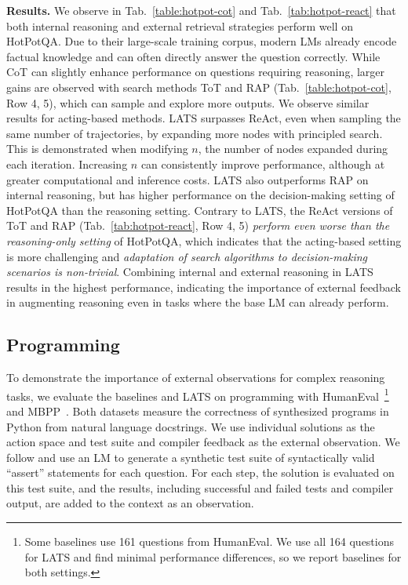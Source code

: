 \documentclass{article}
\newcommand{\yxw}[1]{\textcolor{blue}{[{\bf yxw:} #1]}}
\newcommand{\kai}[1]{\textcolor{purple}{[{\bf kai:} #1]}}
\newcommand{\az}[1]{\textcolor{orange}{[{\bf andy:} #1]}}
\theoremstyle{plain}
\theoremstyle{definition}
\theoremstyle{remark}
\begin{document}
\textbf{Results.} We observe in Tab.~\ref{table:hotpot-cot} and Tab.~\ref{tab:hotpot-react} that both internal reasoning and external retrieval strategies perform well on HotPotQA. Due to their large-scale training corpus, modern LMs already encode factual knowledge and can often directly answer the question correctly. While CoT can slightly enhance performance on questions requiring reasoning, larger gains are observed with search methods ToT and RAP (Tab.~\ref{table:hotpot-cot}, Row 4, 5), which can sample and explore more outputs. We observe similar results for acting-based methods. LATS surpasses ReAct, even when sampling the same number of trajectories, by expanding more nodes with principled search. This is demonstrated when modifying $n$, the number of nodes expanded during each iteration. Increasing $n$ can consistently improve performance, although at greater computational and inference costs. LATS also outperforms RAP on internal reasoning, but has higher performance on the decision-making setting of HotPotQA than the reasoning setting. Contrary to LATS, the ReAct versions of ToT and RAP (Tab.~\ref{tab:hotpot-react}, Row 4, 5) \textit{perform even worse than the reasoning-only setting} of HotPotQA, which indicates that the acting-based setting is more challenging and \emph{adaptation of search algorithms to decision-making scenarios is non-trivial}. Combining internal and external reasoning in LATS results in the highest performance, indicating the importance of external feedback in augmenting reasoning even in tasks where the base LM can already perform.

\subsection{Programming}



To demonstrate the importance of external observations for complex reasoning tasks, we evaluate the baselines and LATS on programming with HumanEval~\citep{chen2021evaluating}\footnote{Some baselines use 161 questions from HumanEval. We use all 164 questions for LATS and find minimal performance differences, so we report baselines for both settings.} and MBPP~\citep{austin2021program}. Both datasets measure the correctness of synthesized programs in Python from natural language docstrings. We use individual solutions as the action space and test suite and compiler feedback as the external observation. We follow \citet{bei2022codet} and use an LM to generate a synthetic test suite of syntactically valid ``assert'' statements for each question. For each step, the solution is evaluated on this test suite, and the results, including successful and failed tests and compiler output, are added to the context as an observation. 
\end{document}

